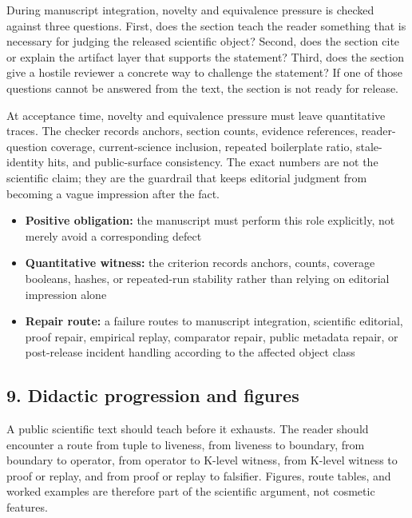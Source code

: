 During manuscript integration, novelty and equivalence pressure is checked against three questions. First, does the section teach the reader something that is necessary for judging the released scientific object? Second, does the section cite or explain the artifact layer that supports the statement? Third, does the section give a hostile reviewer a concrete way to challenge the statement? If one of those questions cannot be answered from the text, the section is not ready for release.


At acceptance time, novelty and equivalence pressure must leave quantitative traces. The checker records anchors, section counts, evidence references, reader-question coverage, current-science inclusion, repeated boilerplate ratio, stale-identity hits, and public-surface consistency. The exact numbers are not the scientific claim; they are the guardrail that keeps editorial judgment from becoming a vague impression after the fact.


\begin{itemize}[leftmargin=1.8em]

\item \textbf{Positive obligation:} the manuscript must perform this role explicitly, not merely avoid a corresponding defect

\item \textbf{Quantitative witness:} the criterion records anchors, counts, coverage booleans, hashes, or repeated-run stability rather than relying on editorial impression alone

\item \textbf{Repair route:} a failure routes to manuscript integration, scientific editorial, proof repair, empirical replay, comparator repair, public metadata repair, or post-release incident handling according to the affected object class

\end{itemize}

\subsection{9. Didactic progression and figures}

A public scientific text should teach before it exhausts. The reader should encounter a route from tuple to liveness, from liveness to boundary, from boundary to operator, from operator to K-level witness, from K-level witness to proof or replay, and from proof or replay to falsifier. Figures, route tables, and worked examples are therefore part of the scientific argument, not cosmetic features.


